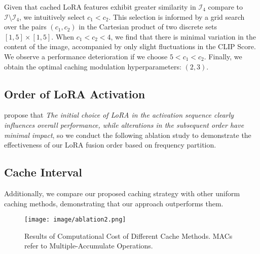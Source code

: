 Given that cached LoRA features exhibit greater similarity in $\mathcal{I}_{4}$ compare to $\mathcal{I}\setminus\mathcal{I}_{4}$, we intuitively select $c_{1} < c_{2}$. This selection is informed by a grid search over the pairs $(c_{1},c_{2})$ in the Cartesian product of two discrete sets $[1,5]\times[1,5]$. When $c_1<c_2<4$, we find that there is minimal variation in the content of the image, accompanied by only slight fluctuations in the CLIP Score. We observe a performance deterioration if we choose $5<c_1<c_2$. Finally, we obtain the optimal caching modulation hyperparameters: $(2,3)$.

\subsection{Order of LoRA Activation}
\label{sec:ablation1}
\citet{multilora} propose that \textit{The initial choice of LoRA in the activation sequence clearly influences overall performance, while alterations in the subsequent order have minimal impact}, so we conduct the following ablation study to demonstrate the effectiveness of our LoRA fusion order based on frequency partition.



\subsection{Cache Interval}
\label{sec:ablation2}
Additionally, we compare our proposed caching strategy with other uniform caching methods, demonstrating that our approach outperforms them.



\begin{figure}[H]
\begin{center}
\texttt{[image: image/ablation2.png]}
\end{center}
\caption{Results of Computational Cost of Different Cache Methods. MACs refer to Multiple-Accumulate Operations.}
\end{figure}
